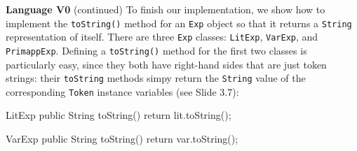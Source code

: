 \begin{minipage}[t]{\sw}
\slidenumber
\LARGE
{\bf Language V0} (continued)\exx
To finish our implementation,
we show how to implement the \verb'toString()' method
for an \verb'Exp' object so that it returns
a \verb'String' representation of itself.\exx
There are three \verb'Exp' classes:
\verb'LitExp', \verb'VarExp', and \verb'PrimappExp'.
Defining a \verb'toString()' method
for the first two classes is particularly easy,
since they both have right-hand sides
that are just token strings:
their \verb'toString' methods simpy return
the \verb'String' value of the corresponding \verb'Token' instance variables
(see Slide 3.7):
{\Large
\begin{qv}
LitExp
    public String toString() {
        return lit.toString();
    }

VarExp
    public String toString() {
        return var.toString();
    }
\end{qv}
}
\end{minipage}
\clearpage

